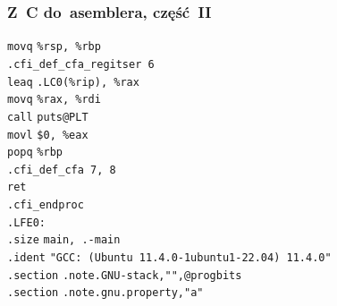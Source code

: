 \documentclass[10pt,t]{beamer}
\begin{document}
\begin{frame}
  \frametitle{Z~C do~asemblera, część~II}


  \hphantom{aaaaa} \texttt{movq} \hphantom{aaa} \texttt{\%rsp, \%rbp} \\
  \hphantom{aaaaa} \texttt{.cfi\_def\_cfa\_regitser 6} \\
  \hphantom{aaaaa} \texttt{leaq} \hphantom{aaa}
  \texttt{.LC0(\%rip), \%rax} \\
  \hphantom{aaaaa} \texttt{movq} \hphantom{aaa} \texttt{\%rax, \%rdi} \\
  \hphantom{aaaaa} \texttt{call} \hphantom{aaa} \texttt{puts@PLT} \\
  \hphantom{aaaaa} \texttt{movl} \hphantom{aaa} \texttt{\$0, \%eax} \\
  \hphantom{aaaaa} \texttt{popq} \hphantom{aaa} \texttt{\%rbp} \\
  \hphantom{aaaaa} \texttt{.cfi\_def\_cfa 7, 8} \\
  \hphantom{aaaaa} \texttt{ret} \\
  \hphantom{aaaaa} \texttt{.cfi\_endproc} \\
  \texttt{.LFE0:} \\
  \hphantom{aaaaa} \texttt{.size} \hphantom{aaa} \texttt{main, .-main} \\
  \hphantom{aaaaa} \texttt{.ident} \hphantom{aa}
  \texttt{"GCC: (Ubuntu 11.4.0-1ubuntu1-22.04) 11.4.0"} \\
  \hphantom{aaaaa} \texttt{.section} \hphantom{aaaaaa}
  \texttt{.note.GNU-stack,"",@progbits} \\
  \hphantom{aaaaa} \texttt{.section} \hphantom{aaaaaa}
  \texttt{.note.gnu.property,"a"}

\end{frame}
\end{document}
